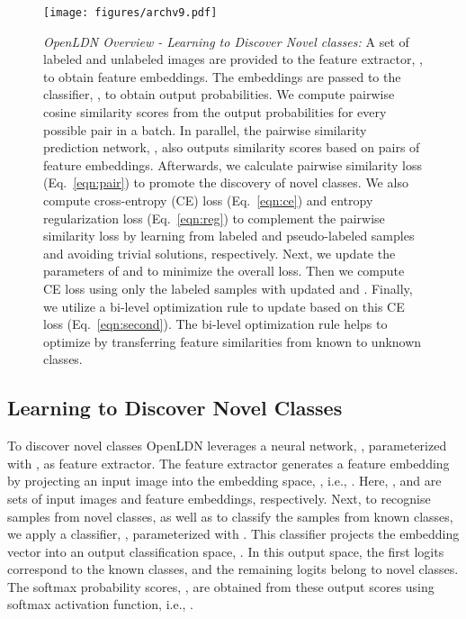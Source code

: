 \documentclass[runningheads]{eccv2022submission}
\begin{document}
\begin{figure*}[t]
\vspace{2mm}
\begin{center}
  \texttt{[image: figures/archv9.pdf]}
\end{center}
\vspace{-2mm}
\caption{\small\emph{OpenLDN Overview - Learning to Discover Novel classes:} A set of labeled and unlabeled images are provided to the feature extractor, , to obtain feature embeddings. The embeddings are passed to the classifier, , to obtain output probabilities. We compute pairwise cosine similarity scores from the output probabilities for every possible pair in a batch. In parallel, the pairwise similarity prediction network, , also outputs similarity scores based on pairs of feature embeddings. Afterwards, we calculate pairwise similarity loss (Eq.~\ref{eqn:pair}) to promote the discovery of novel classes. We also compute cross-entropy (CE) loss (Eq.~\ref{eqn:ce}) and entropy regularization loss (Eq.~\ref{eqn:reg}) to complement the pairwise similarity loss by learning from labeled and pseudo-labeled samples and avoiding trivial solutions, respectively. Next, we update the parameters of  and  to minimize the overall loss. Then we compute CE loss using only the labeled samples with updated  and . Finally, we utilize a bi-level optimization rule to update  based on this CE loss (Eq.~\ref{eqn:second}). The bi-level optimization rule helps to optimize  by transferring feature similarities from known to unknown classes.}
\vspace{-2mm}
\label{fig:arch}
\end{figure*}

\vspace{-4mm}
\subsection{Learning to Discover Novel Classes}
To discover novel classes OpenLDN leverages a neural network, , parameterized with , as feature extractor. The feature extractor generates a feature embedding by projecting an input image  into the embedding space, , i.e., . Here, , and  are sets of input images and feature embeddings, respectively. Next, to recognise samples from novel classes, as well as to classify the samples from known classes, we apply a classifier, , parameterized with . This classifier projects the embedding vector  into an output classification space,  . In this output space, the first  logits correspond to the known classes, and the remaining  logits belong to novel classes. The softmax probability scores, , are obtained from these output scores using softmax activation function, i.e., . 
\end{document}
